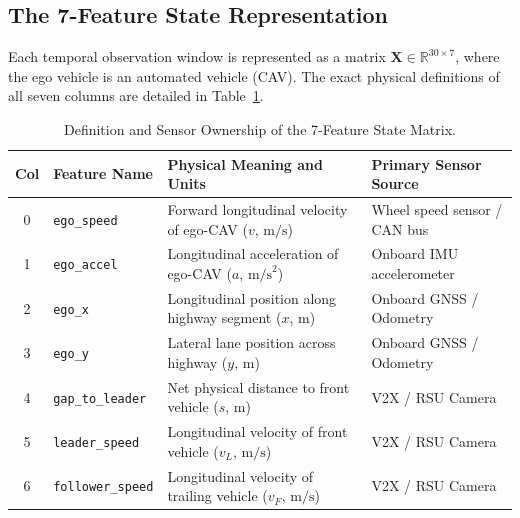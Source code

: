 \documentclass[11pt,a4paper]{article}
\begin{document}
\subsection{The 7-Feature State Representation}
Each temporal observation window is represented as a matrix $\mathbf{X} \in \mathbb{R}^{30 \times 7}$, where the ego vehicle is an automated vehicle (CAV). The exact physical definitions of all seven columns are detailed in Table~\ref{tab:features}.

\begin{table}[h!]
    \centering
    \caption{Definition and Sensor Ownership of the 7-Feature State Matrix.}
    \label{tab:features}
    \small
    \begin{tabularx}{\textwidth}{@{} c l X l @{}}
        \toprule
        \textbf{Col} & \textbf{Feature Name} & \textbf{Physical Meaning and Units} & \textbf{Primary Sensor Source} \\
        \midrule
        0 & \texttt{ego\_speed} & Forward longitudinal velocity of ego-CAV ($v$, $\text{m/s}$) & Wheel speed sensor / CAN bus \\
        1 & \texttt{ego\_accel} & Longitudinal acceleration of ego-CAV ($a$, $\text{m/s}^2$) & Onboard IMU accelerometer \\
        2 & \texttt{ego\_x} & Longitudinal position along highway segment ($x$, $\text{m}$) & Onboard GNSS / Odometry \\
        3 & \texttt{ego\_y} & Lateral lane position across highway ($y$, $\text{m}$) & Onboard GNSS / Odometry \\
        4 & \texttt{gap\_to\_leader} & Net physical distance to front vehicle ($s$, $\text{m}$) & V2X / RSU Camera \\
        5 & \texttt{leader\_speed} & Longitudinal velocity of front vehicle ($v_L$, $\text{m/s}$) & V2X / RSU Camera \\
        6 & \texttt{follower\_speed} & Longitudinal velocity of trailing vehicle ($v_F$, $\text{m/s}$) & V2X / RSU Camera \\
        \bottomrule
    \end{tabularx}
\end{table}
\end{document}
